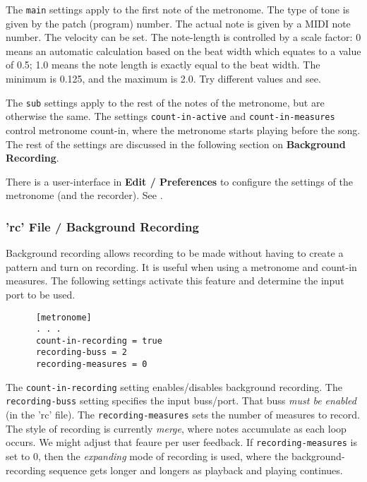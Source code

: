    The \texttt{main} settings apply to the first note of the metronome.
   The type of tone is given by the patch (program) number.
   The actual note is given by a MIDI note number.
   The velocity can be set.
   The note-length is controlled by a scale factor:  0 means an automatic
   calculation based on the beat width which equates to a value of 0.5;
   1.0 means the note length is exactly equal to the beat width.
   The minimum is 0.125, and the maximum is 2.0.
   Try different values and see.

   The \texttt{sub} settings apply to the rest of the notes of the metronome,
   but are otherwise the same.
   The settings \texttt{count-in-active} and \texttt{count-in-measures}
   control metronome count-in, where the metronome starts playing before the
   song.
   The rest of the settings are discussed in the following section on
   \textbf{Background Recording}.

   There is a user-interface in
   \textbf{Edit / Preferences} to configure the settings of the metronome (and
   the recorder).
   See .

\subsubsection{'rc' File / Background Recording}
\label{subsubsec:configuration_rc_background_recording}

   Background recording allows recording to be made without having to create a
   pattern and turn on recording.
   It is useful when using a metronome and count-in measures.
   The following settings activate this feature
   and determine the input port to be used.

   \begin{verbatim}
      [metronome]
      . . .
      count-in-recording = true
      recording-buss = 2
      recording-measures = 0
   \end{verbatim}

   The \texttt{count-in-recording} setting enables/disables background recording.
   The \texttt{recording-buss} setting specifies the input buss/port.
   That buss \textsl{must be enabled} (in the 'rc' file).
   The \texttt{recording-measures} sets the number of measures to record.
   The style of recording is currently \textsl{merge},
   where notes accumulate as each loop occurs.
   We might adjust that feaure per user feedback.
   If \texttt{recording-measures} is set to 0, then the
   \textsl{expanding} mode of recording is used, where
   the background-recording sequence gets longer and longers
   as playback and playing continues.

